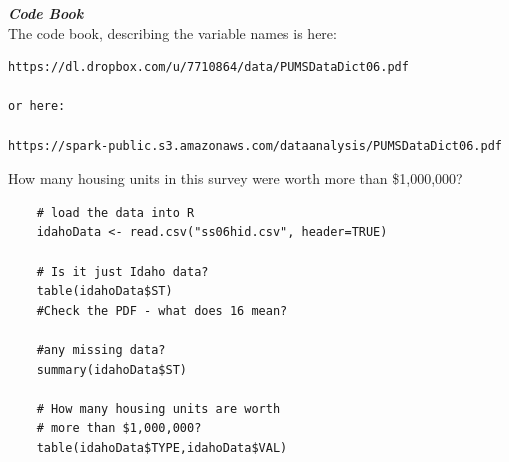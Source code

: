 \documentclass{beamer}
\begin{document}
\begin{frame}[fragile]
\noindent \textbf{\textit{Code Book}}\\
The code book, describing the variable names is here: 

\begin{verbatim}
https://dl.dropbox.com/u/7710864/data/PUMSDataDict06.pdf

or here: 

https://spark-public.s3.amazonaws.com/dataanalysis/PUMSDataDict06.pdf
\end{verbatim}
\end{frame}
\begin{frame}[fragile]

How many housing units in this survey were worth more than \$1,000,000?

%	

\end{frame}


\begin{frame}[fragile]

\begin{framed}
	\begin{verbatim}	
	# load the data into R
	idahoData <- read.csv("ss06hid.csv", header=TRUE)
	
	# Is it just Idaho data?
	table(idahoData$ST)
	#Check the PDF - what does 16 mean?
	
	#any missing data?
	summary(idahoData$ST)
	
	# How many housing units are worth
	# more than $1,000,000?
	table(idahoData$TYPE,idahoData$VAL)
	\end{verbatim}
\end{framed}

\end{frame}
\end{document}
